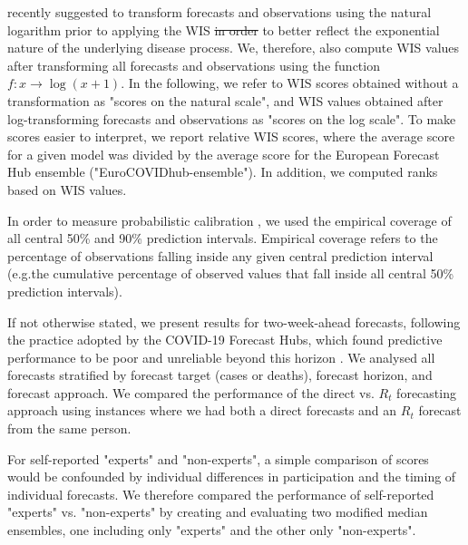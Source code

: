 \documentclass[10pt,a4paper,twocolumn]{article}
\providecommand{\DIFaddtex}[1]{{\protect\color{blue}\uwave{#1}}} %
\providecommand{\DIFdeltex}[1]{{\protect\color{red}\sout{#1}}}                      %
\providecommand{\DIFaddbegin}{} %
\providecommand{\DIFaddend}{} %
\providecommand{\DIFdelbegin}{} %
\providecommand{\DIFdelend}{} %
\providecommand{\DIFadd}[1]{\texorpdfstring{\DIFaddtex{#1}}{#1}} %
\providecommand{\DIFdel}[1]{\texorpdfstring{\DIFdeltex{#1}}{}} %
\begin{document}
\citet{bosseTransformationForecastsEvaluating2023} recently suggested to transform forecasts and observations using the natural logarithm prior to applying the WIS \DIFdelbegin \DIFdel{in order }\DIFdelend to better reflect the exponential nature of the underlying disease process. We, therefore, also compute WIS values after transforming all forecasts and observations using the function $f\colon x \to \log (x + 1)$. In the following, we refer to WIS scores obtained without a transformation as "scores on the natural scale", and WIS values obtained after log-transforming forecasts and observations as "scores on the log scale". To make scores easier to interpret, we report relative WIS scores, where the average score for a given model was divided by the average score for the European Forecast Hub ensemble ("EuroCOVIDhub-ensemble"). In addition, we computed ranks based on WIS values. 

In order to measure probabilistic calibration \citep{gneitingProbabilisticForecastsCalibration2007}, we used the empirical coverage of all central 50\% and 90\% prediction intervals. Empirical coverage refers to the percentage of observations falling inside any given central prediction interval (e.g.\DIFaddbegin \DIFadd{, }\DIFaddend the cumulative percentage of observed values that fall inside all central 50\% prediction intervals). 

If not otherwise stated, we present results for two-week-ahead forecasts, following the practice adopted by the COVID-19 Forecast Hubs, which found predictive performance to be poor and unreliable beyond this horizon \cite{cramerEvaluationIndividualEnsemble2021, sherrattPredictivePerformanceMultimodel2022, bracherShorttermForecastingCOVID192021}. We analysed all forecasts stratified by forecast target (cases or deaths), forecast horizon, and forecast approach. We compared the performance of the direct vs. $R_t$ forecasting approach using instances where we had both a direct forecasts and an $R_t$ forecast from the same person. 

For self-reported "experts" and "non-experts", a simple comparison of scores would be confounded by individual differences in participation and the timing of individual forecasts. We therefore compared the performance of self-reported "experts" vs. "non-experts" by creating and evaluating two modified median ensembles, one including only "experts" and the other only "non-experts".

\end{document}
